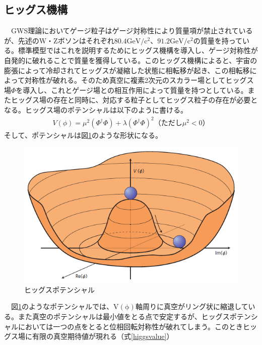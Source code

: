 \subsection{ヒッグス機構}
　GWS理論においてゲージ粒子はゲージ対称性により質量項が禁止されているが、先述のW・Zボソンはそれぞれ$80.4\mathrm{GeV/c^2}$、$91.2\mathrm{GeV/c^2}$の質量を持っている。標準模型ではこれを説明するためにヒッグス機構を導入し、ゲージ対称性が自発的に破れることで質量を獲得している。このヒッグス機構によると、宇宙の膨張によって冷却されてヒッグスが凝縮した状態に相転移が起き、この相転移によって対称性が破れる。そのため真空に複素2次元のスカラー場としてヒッグス場$\Phi$を導入し、これとゲージ場との相互作用によって質量を持つとしている。またヒッグス場の存在と同時に、対応する粒子としてヒッグス粒子の存在が必要となる。ヒッグス場のポテンシャルは以下のように書ける\cite{gaugehiggs}。
\begin{align}
V(\phi) = {\mu}^2({\Phi}^\dag \Phi) + \lambda ({\Phi}^\dag \Phi)^2　（ただし{\mu}^2 < 0）
\end{align}
そして、ポテンシャルは図\ref{higgspotential}のような形状になる。\\
\begin{figure}[H]
	\begin{center}
 \includegraphics[keepaspectratio, scale=0.3]
 	{Figure/Introduction/higgspotential.png}
 		\caption{ヒッグスポテンシャル\cite{higgspotential}}
 		\label{higgspotential}
	\end{center}
\end{figure}
　図\ref{higgspotential}のようなポテンシャルでは、$\mathrm{V(\phi)}$軸周りに真空がリング状に縮退している。また真空のポテンシャルは最小値をとる点で安定するが、ヒッグスポテンシャルにおいては一つの点をとると位相回転対称性が破れてしまう。このときヒッグス場に有限の真空期待値が現れる（式\ref{higgsvalue}）\\
